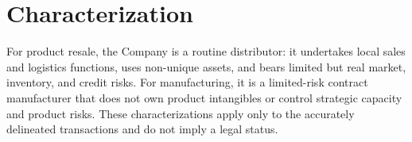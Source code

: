\section{Characterization}
For product resale, the Company is a routine distributor: it undertakes local
sales and logistics functions, uses non-unique assets, and bears limited but real
market, inventory, and credit risks. For manufacturing, it is a limited-risk
contract manufacturer that does not own product intangibles or control strategic
capacity and product risks. These characterizations apply only to the accurately
delineated transactions and do not imply a legal status.

